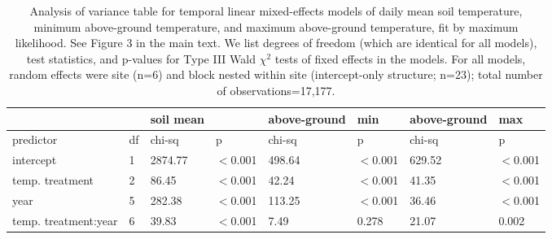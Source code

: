\documentclass{article}
\begin{document}
\begin{table}[ht]
\centering
\caption{Analysis of variance table for temporal linear mixed-effects models of daily mean soil temperature, minimum above-ground temperature, and maximum above-ground temperature, fit by maximum likelihood. See Figure 3 in the main text. We list degrees of freedom (which are identical for all models), test statistics, and p-values for Type III Wald $\chi^{2}$ tests of fixed effects in the models. For all models, random effects were site (n=6) and block nested within site (intercept-only structure; n=23); total number of observations=17,177.} 
\label{table:blocks_time}
\begin{tabular}{|p{}|p{}|p{}p{}|p{}p{}|p{}p{}|}
   \hline
 &  & soil mean &  & above-ground & min & above-ground & max \\ 
   \hline
predictor & df & chi-sq & p & chi-sq & p & chi-sq & p \\ 
   \hline
intercept & 1 & 2874.77 & $<$0.001 & 498.64 & $<$0.001 & 629.52 & $<$0.001 \\ 
  temp. treatment & 2 & 86.45 & $<$0.001 & 42.24 & $<$0.001 & 41.35 & $<$0.001 \\ 
  year & 5 & 282.38 & $<$0.001 & 113.25 & $<$0.001 & 36.46 & $<$0.001 \\ 
  temp. treatment:year & 6 & 39.83 & $<$0.001 & 7.49 & 0.278 & 21.07 & 0.002 \\ 
   \hline
\end{tabular}
\end{table}%
\end{document}
